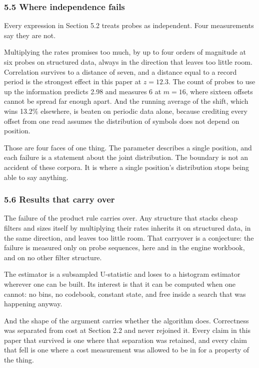 \subsubsection{5.5 Where independence fails}

Every expression in Section 5.2 treats probes as independent. Four measurements say they are not.

Multiplying the rates promises too much, by up to four orders of magnitude at six probes on structured data, always in the direction that leaves too little room. Correlation survives to a distance of seven, and a distance equal to a record period is the strongest effect in this paper at \(z = 12.3\). The count of probes to use up the information predicts 2.98 and measures 6 at \(m = 16\), where sixteen offsets cannot be spread far enough apart. And the running average of the shift, which wins 13.2\% elsewhere, is beaten on periodic data alone, because crediting every offset from one read assumes the distribution of symbols does not depend on position.

Those are four faces of one thing. The parameter describes a single position, and each failure is a statement about the joint distribution. The boundary is not an accident of these corpora. It is where a single position's distribution stops being able to say anything.

\subsubsection{5.6 Results that carry over}

The failure of the product rule carries over. Any structure that stacks cheap filters and sizes itself by multiplying their rates inherits it on structured data, in the same direction, and leaves too little room. That carryover is a conjecture: the failure is measured only on probe sequences, here and in the engine workbook, and on no other filter structure.

The estimator is a subsampled U-statistic and loses to a histogram estimator wherever one can be built. Its interest is that it can be computed when one cannot: no bins, no codebook, constant state, and free inside a search that was happening anyway.

And the shape of the argument carries whether the algorithm does. Correctness was separated from cost at Section 2.2 and never rejoined it. Every claim in this paper that survived is one where that separation was retained, and every claim that fell is one where a cost measurement was allowed to be in for a property of the thing.

